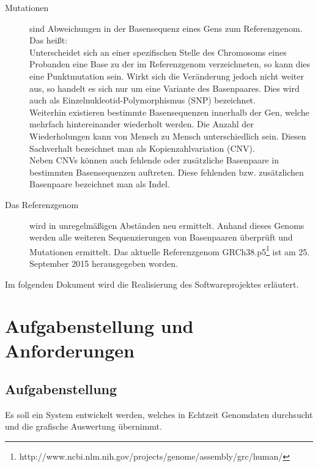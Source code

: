 \begin{description}
\item[Mutationen] sind Abweichungen in der Basensequenz eines Gens zum Referenzgenom. Das heißt:\\Unterscheidet sich an einer spezifischen Stelle des Chromosoms eines Probanden eine Base zu der im Referenzgenom verzeichneten, so kann dies eine Punktmutation sein. Wirkt sich die Veränderung jedoch nicht weiter aus, so handelt es sich nur um eine Variante des Basenpaares. Dies wird auch als Einzelnukleotid-Polymorphismus (SNP) bezeichnet.\\
Weiterhin existieren bestimmte Basensequenzen innerhalb der Gen, welche mehrfach hintereinander wiederholt werden. Die Anzahl der Wiederholungen kann von Mensch zu Mensch unterschiedlich sein. Diesen Sachverhalt bezeichnet man als Kopienzahlvariation (CNV).\\
Neben CNVs können auch fehlende oder zusätzliche Basenpaare in bestimmten Basensequenzen auftreten. Diese fehlenden bzw. zusätzlichen Basenpaare bezeichnet man als Indel.\\


\item[Das Referenzgenom] wird in unregelmäßigen Abständen neu ermittelt. Anhand dieses Genoms werden alle weiteren Sequenzierungen von Basenpaaren überprüft und Mutationen ermittelt. Das aktuelle Referenzgenom GRCh38.p5\footnote{\label{foot:0}http://www.ncbi.nlm.nih.gov/projects/genome/assembly/grc/human/} ist am 25. September 2015 herausgegeben worden.
\end{description}
Im folgenden Dokument wird die Realisierung des Softwareprojektes erläutert.
\newpage


\section{Aufgabenstellung und Anforderungen}
\subsection{Aufgabenstellung}
Es soll ein System entwickelt werden, welches in Echtzeit Genomdaten durchsucht und die grafische Auswertung übernimmt. 
